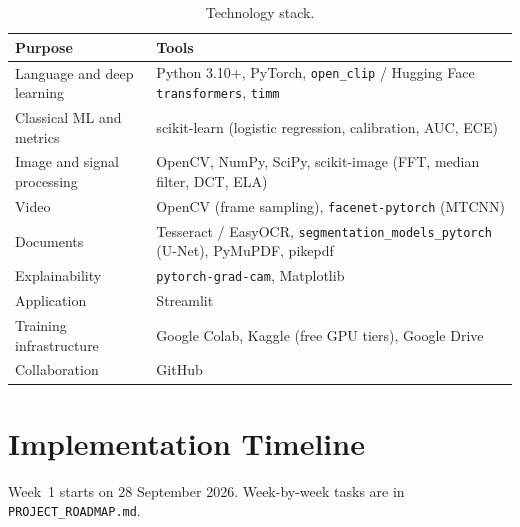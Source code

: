 \documentclass[11pt,a4paper]{article}
\begin{document}
\begin{table}[htbp]
\centering
\small
\begin{tabularx}{\linewidth}{@{}l Y@{}}
\toprule
\textbf{Purpose} & \textbf{Tools} \\
\midrule
Language and deep learning & Python 3.10+, PyTorch, \texttt{open\_clip} / Hugging Face \texttt{transformers}, \texttt{timm} \\
Classical ML and metrics & scikit-learn (logistic regression, calibration, AUC, ECE) \\
Image and signal processing & OpenCV, NumPy, SciPy, scikit-image (FFT, median filter, DCT, ELA) \\
Video & OpenCV (frame sampling), \texttt{facenet-pytorch} (MTCNN) \\
Documents & Tesseract / EasyOCR, \texttt{segmentation\_models\_pytorch} (U-Net), PyMuPDF, pikepdf \\
Explainability & \texttt{pytorch-grad-cam}, Matplotlib \\
Application & Streamlit \\
Training infrastructure & Google Colab, Kaggle (free GPU tiers), Google Drive \\
Collaboration & GitHub \\
\bottomrule
\end{tabularx}
\caption{Technology stack.}
\label{tab:stack}
\end{table}

\section{Implementation Timeline}
\label{sec:timeline}
Week~1 starts on 28 September 2026. Week-by-week tasks are in \texttt{PROJECT\_ROADMAP.md}.
\end{document}
